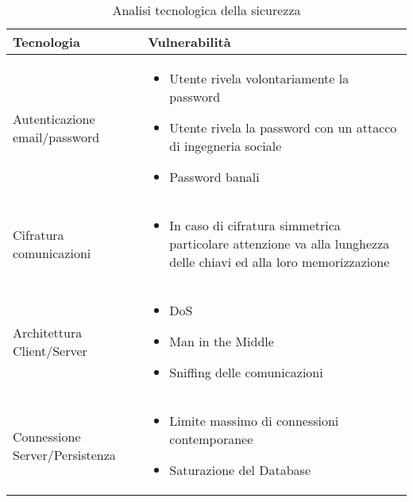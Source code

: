 \begin{table}[htbp]
    \centering
    \begin{tabular} {|P{4cm}|P{12cm}|}
        \hline
        Tecnologia                     & Vulnerabilità                                            \\
        \hline
        Autenticazione email/password  &
        \begin{itemize} 
            \item Utente rivela volontariamente la password
            \item Utente rivela la password con un attacco di ingegneria sociale
            \item Password banali        
        \end{itemize}                                                                 \\
        \hline
        Cifratura comunicazioni        &
        \begin{itemize}
            \item In caso di cifratura simmetrica particolare attenzione va alla lunghezza delle chiavi ed alla loro memorizzazione   
        \end{itemize}                   \\
        \hline
        Architettura Client/Server     & 
        \begin{itemize} 
            \item DoS
            \item Man in the Middle
            \item Sniffing delle comunicazioni  
        \end{itemize}                                                           \\
        \hline
        Connessione Server/Persistenza & \begin{itemize} 
            \item Limite massimo di connessioni contemporanee
            \item Saturazione del Database     
        \end{itemize}                                                            \\
        \hline
    \end{tabular}
    \caption{Analisi tecnologica della sicurezza}
    \label{<label>}
\end{table}

